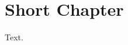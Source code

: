 \documentclass[a4paper,12pt]{report}
\begin{document}
\titlePage
\clearpage
\tableofcontents
\chapter{Short Chapter}
Text.
\end{document}
